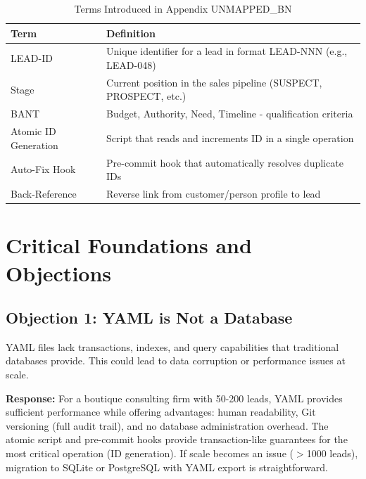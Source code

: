 \begin{table}[htbp]
\centering
\caption{Terms Introduced in Appendix UNMAPPED_BN}
\label{tab:bn-glossary}
\renewcommand{\arraystretch}{1.3}
\begin{tabular}{@{}p{3cm}p{9cm}@{}}
\toprule
\textbf{Term} & \textbf{Definition} \\
\midrule
LEAD-ID & Unique identifier for a lead in format LEAD-NNN (e.g., LEAD-048) \\
Stage & Current position in the sales pipeline (SUSPECT, PROSPECT, etc.) \\
BANT & Budget, Authority, Need, Timeline - qualification criteria \\
Atomic ID Generation & Script that reads and increments ID in a single operation \\
Auto-Fix Hook & Pre-commit hook that automatically resolves duplicate IDs \\
Back-Reference & Reverse link from customer/person profile to lead \\
\bottomrule
\end{tabular}
\end{table}


\section{Critical Foundations and Objections}
\label{sec:bn-foundations}

\subsection{Objection 1: YAML is Not a Database}

\begin{tcolorbox}[colback=red!5!white, colframe=red!50!black,
    title=Objection: YAML lacks database features]
YAML files lack transactions, indexes, and query capabilities that traditional databases provide. This could lead to data corruption or performance issues at scale.
\end{tcolorbox}

\textbf{Response:} For a boutique consulting firm with 50-200 leads, YAML provides sufficient performance while offering advantages: human readability, Git versioning (full audit trail), and no database administration overhead. The atomic script and pre-commit hooks provide transaction-like guarantees for the most critical operation (ID generation). If scale becomes an issue ($>$1000 leads), migration to SQLite or PostgreSQL with YAML export is straightforward.

